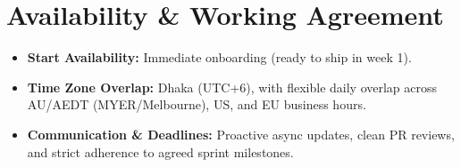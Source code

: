 \documentclass[10.5pt,a4paper]{article}
\begin{document}
\section*{Availability \& Working Agreement}
\begin{itemize}[leftmargin=12pt, itemsep=3pt]
    \item \textbf{Start Availability:} Immediate onboarding (ready to ship in week 1).
    \item \textbf{Time Zone Overlap:} Dhaka (UTC+6), with flexible daily overlap across AU/AEDT (MYER/Melbourne), US, and EU business hours.
    \item \textbf{Communication & Deadlines:} Proactive async updates, clean PR reviews, and strict adherence to agreed sprint milestones.
\end{itemize}
\end{document}
